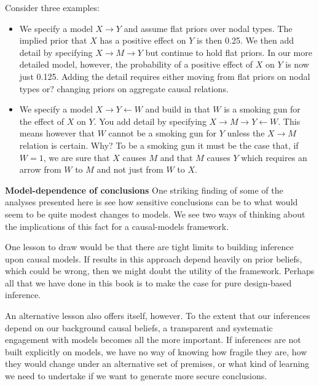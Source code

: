 \documentclass[
  12pt,
]{book}
\providecommand{\tightlist}{%
  \setlength{\itemsep}{0pt}\setlength{\parskip}{0pt}}
\begin{document}
Consider three examples:

\begin{itemize}
\tightlist
\item
  We specify a model \(X \rightarrow Y\) and assume flat priors over nodal types. The implied prior that \(X\) has a positive effect on \(Y\) is then 0.25. We then add detail by specifying \(X \rightarrow M \rightarrow Y\) but continue to hold flat priors. In our more detailed model, however, the probability of a positive effect of \(X\) on \(Y\) is now just 0.125. Adding the detail requires either moving from flat priors on nodal types or? changing priors on aggregate causal relations.
\end{itemize}

\begin{itemize}
\tightlist
\item
  We specify a model \(X \rightarrow Y \leftarrow W\) and build in that \(W\) is a smoking gun for the effect of \(X\) on \(Y\). You add detail by specifying \(X \rightarrow M \rightarrow Y \leftarrow W\). This means however that \(W\) cannot be a smoking gun for \(Y\) unless the \(X \rightarrow M\) relation is certain. Why? To be a smoking gun it must be the case that, if \(W=1\), we are sure that \(X\) causes \(M\) and that \(M\) causes \(Y\) which requires an arrow from \(W\) to \(M\) and not just from \(W\) to \(X\).
\end{itemize}

\textbf{Model-dependence of conclusions} One striking finding of some of the analyses presented here is see how sensitive conclusions can be to what would seem to be quite modest changes to models. We see two ways of thinking about the implications of this fact for a causal-models framework.

One lesson to draw would be that there are tight limits to building inference upon causal models. If results in this approach depend heavily on prior beliefs, which could be wrong, then we might doubt the utility of the framework. Perhaps all that we have done in this book is to make the case for pure design-based inference.

An alternative lesson also offers itself, however. To the extent that our inferences depend on our background causal beliefs, a transparent and systematic engagement with models becomes all the more important. If inferences are not built explicitly on models, we have no way of knowing how fragile they are, how they would change under an alternative set of premises, or what kind of learning we need to undertake if we want to generate more secure conclusions.
\end{document}
